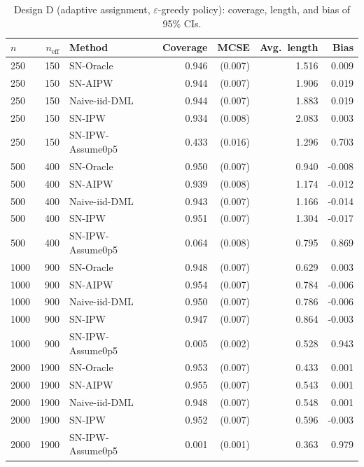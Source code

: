 \documentclass[11pt]{article}
\numberwithin{equation}{section}
\newcommand{\mcse}[1]{{\footnotesize\,(#1)}}
\theoremstyle{plain}
\theoremstyle{definition}
\theoremstyle{remark}
\begin{document}
\begin{table}[!htbp]
\centering
\small
\begin{threeparttable}
\caption{Design D (adaptive assignment, $\varepsilon$-greedy policy): coverage, length, and bias of 95\% CIs.}
\label{tab:simD_eps}
\begin{tabular}{@{}l r l r r r r@{}}
\toprule
{$n$} & {$n_{\mathrm{eff}}$} & {Method} & {Coverage} & {MCSE} & {Avg.\ length} & {Bias} \\
\midrule
250 & 150 & SN-Oracle & 0.946 & \mcse{0.007} & 1.516 & 0.009 \\
250 & 150 & SN-AIPW & 0.944 & \mcse{0.007} & 1.906 & 0.019 \\
250 & 150 & Naive-iid-DML & 0.944 & \mcse{0.007} & 1.883 & 0.019 \\
250 & 150 & SN-IPW & 0.934 & \mcse{0.008} & 2.083 & 0.003 \\
250 & 150 & SN-IPW-Assume0p5 & 0.433 & \mcse{0.016} & 1.296 & 0.703 \\
500 & 400 & SN-Oracle & 0.950 & \mcse{0.007} & 0.940 & -0.008 \\
500 & 400 & SN-AIPW & 0.939 & \mcse{0.008} & 1.174 & -0.012 \\
500 & 400 & Naive-iid-DML & 0.943 & \mcse{0.007} & 1.166 & -0.014 \\
500 & 400 & SN-IPW & 0.951 & \mcse{0.007} & 1.304 & -0.017 \\
500 & 400 & SN-IPW-Assume0p5 & 0.064 & \mcse{0.008} & 0.795 & 0.869 \\
1000 & 900 & SN-Oracle & 0.948 & \mcse{0.007} & 0.629 & 0.003 \\
1000 & 900 & SN-AIPW & 0.954 & \mcse{0.007} & 0.784 & -0.006 \\
1000 & 900 & Naive-iid-DML & 0.950 & \mcse{0.007} & 0.786 & -0.006 \\
1000 & 900 & SN-IPW & 0.947 & \mcse{0.007} & 0.864 & -0.003 \\
1000 & 900 & SN-IPW-Assume0p5 & 0.005 & \mcse{0.002} & 0.528 & 0.943 \\
2000 & 1900 & SN-Oracle & 0.953 & \mcse{0.007} & 0.433 & 0.001 \\
2000 & 1900 & SN-AIPW & 0.955 & \mcse{0.007} & 0.543 & 0.001 \\
2000 & 1900 & Naive-iid-DML & 0.948 & \mcse{0.007} & 0.548 & 0.001 \\
2000 & 1900 & SN-IPW & 0.952 & \mcse{0.007} & 0.596 & -0.003 \\
2000 & 1900 & SN-IPW-Assume0p5 & 0.001 & \mcse{0.001} & 0.363 & 0.979 \\

\end{tabular}
\end{threeparttable}
\end{table}
\end{document}
